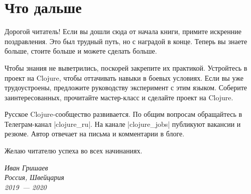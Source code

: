 \chapter{Что дальше}

Дорогой читатель! Если вы дошли сюда от начала книги, примите искренние
поздравления. Это был трудный путь, но с наградой в конце. Теперь вы знаете
больше, стоите больше и можете сделать больше.

Чтобы знания не выветрились, поскорей закрепите их практикой. Устройтесь в
проект на Clojure, чтобы оттачивать навыки в боевых условиях. Если вы уже
трудоустроены, предложите руководству эксперимент с этим языком. Соберите
заинтересованных, прочитайте мастер-класс и сделайте проект на Clojure.

Русское Clojure-сообщество развивается. По общим вопросам обращайтесь в
Телеграм-канал \spverb|clojure_ru|. На канале \spverb|clojure_jobs| публикуют
вакансии и резюме. Автор отвечает на письма и комментарии в блоге.

Желаю читателю успеха во всех начинаниях.

\vspace{1em}

\noindent
\textit{Иван Гришаев\\Россия, Швейцария\\2019~--- 2020}
